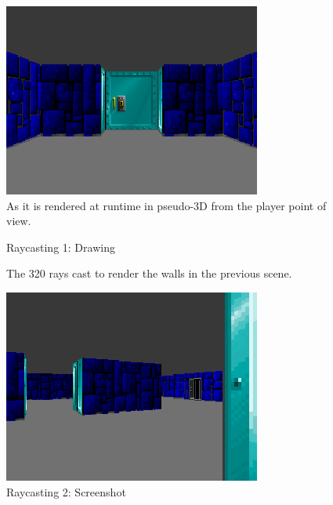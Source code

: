 \documentclass[book.tex]{subfiles}
\begin{document}
\begin{figure}[H]
  \centering
 \includegraphics[width=\textwidth]{imgs/ray_caster_explained/beginning.png}
 \caption{As it is rendered at runtime in pseudo-3D from the player point of view.} 
\end{figure}

\begin{figure}[H]
  \centering
  
 \caption{Raycasting 1: Drawing} 
\end{figure}


\begin{figure}[H]
\centering
 
 \caption{The 320 rays cast to render the walls in the previous scene.} \label{fig:Raycasting2}
\end{figure}


\begin{figure}[H]
  \centering
 \includegraphics[width=\textwidth]{imgs/ray_caster_explained/out_door.png}
 \caption{Raycasting 2: Screenshot} 
\end{figure}
\end{document}
